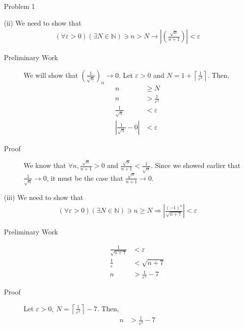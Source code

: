 \documentclass[8pt]{extarticle}
\newcommand{\N}{\mathbb{N}}
\begin{document}
\begin{problem}{Problem 1}
    \begin{problem}{(ii)}
      We need to show that
      \begin{align*}
        (\forall \varepsilon > 0)(\exists N\in \N) \ni n > N \rightarrow \left|\left(\frac{\sqrt{n}}{n + 1}\right)\right| < \varepsilon
      \end{align*}
      \begin{description}
        \item[Preliminary Work] We will show that $\displaystyle\left(\frac{1}{\sqrt{n}}\right)_n\rightarrow 0$. Let $\varepsilon > 0$ and $\displaystyle N = 1 + \left\lceil \frac{1}{\varepsilon^2}\right\rceil$. Then,
          \begin{align*}
            n &\geq N\\
            n &> \frac{1}{\varepsilon^2}\\
            \frac{1}{\sqrt{n}} &< \varepsilon \\
            \left|\frac{1}{\sqrt{n}} - 0\right| &< \varepsilon
          \end{align*}
        \item[Proof] We know that $\forall n, \frac{\sqrt{n}}{n+1} > 0$ and $\frac{\sqrt{n}}{n+1} < \frac{1}{\sqrt{n}}$. Since we showed earlier that $\frac{1}{\sqrt{n}} \rightarrow 0$, it must be the case that $\frac{\sqrt{n}}{n+1} \rightarrow 0$.
      \end{description}
    \end{problem}
    \begin{problem}{(iii)}
      We need to show that
      \begin{align*}
        (\forall \varepsilon > 0)(\exists N \in \N) \ni n \geq N \Rightarrow \left|\frac{(-1)^n}{\sqrt{n+7}}\right| < \varepsilon
      \end{align*}
      \begin{description}
        \item[Preliminary Work]
          \begin{align*}
            \frac{1}{\sqrt{n+7}} &< \varepsilon\\
            \frac{1}{\varepsilon} & < \sqrt{n+7}\\
            n &> \frac{1}{\varepsilon^2} - 7 
          \end{align*}
        \item[Proof] Let $\varepsilon > 0,~\displaystyle N =  \left\lceil\frac{1}{\varepsilon^2}\right\rceil-7$. Then,
          \begin{align*}
            n &> \frac{1}{\varepsilon^2} - 7\\

\end{align*}
\end{description}
\end{problem}
\end{problem}
\end{document}

